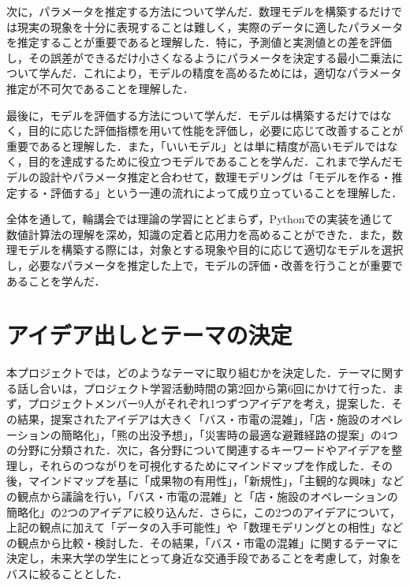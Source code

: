 次に，パラメータを推定する方法について学んだ．数理モデルを構築するだけでは現実の現象を十分に表現することは難しく，実際のデータに適したパラメータを推定することが重要であると理解した．特に，予測値と実測値との差を評価し，その誤差ができるだけ小さくなるようにパラメータを決定する最小二乗法について学んだ．これにより，モデルの精度を高めるためには，適切なパラメータ推定が不可欠であることを理解した．

最後に，モデルを評価する方法について学んだ．モデルは構築するだけではなく，目的に応じた評価指標を用いて性能を評価し，必要に応じて改善することが重要であると理解した．また，「いいモデル」とは単に精度が高いモデルではなく，目的を達成するために役立つモデルであることを学んだ．これまで学んだモデルの設計やパラメータ推定と合わせて，数理モデリングは「モデルを作る・推定する・評価する」という一連の流れによって成り立っていることを理解した．

全体を通して，輪講会では理論の学習にとどまらず，Pythonでの実装を通じて数値計算法の理解を深め，知識の定着と応用力を高めることができた．また，数理モデルを構築する際には，対象とする現象や目的に応じて適切なモデルを選択し，必要なパラメータを推定した上で，モデルの評価・改善を行うことが重要であることを学んだ．

\section{アイデア出しとテーマの決定}
本プロジェクトでは，どのようなテーマに取り組むかを決定した．テーマに関する話し合いは，プロジェクト学習活動時間の第2回から第6回にかけて行った．まず，プロジェクトメンバー9人がそれぞれ1つずつアイデアを考え，提案した．その結果，提案されたアイデアは大きく「バス・市電の混雑」，「店・施設のオペレーションの簡略化」，「熊の出没予想」，「災害時の最適な避難経路の提案」の4つの分野に分類された．次に，各分野について関連するキーワードやアイデアを整理し，それらのつながりを可視化するためにマインドマップを作成した．その後，マインドマップを基に「成果物の有用性」，「新規性」，「主観的な興味」などの観点から議論を行い，「バス・市電の混雑」と「店・施設のオペレーションの簡略化」の2つのアイデアに絞り込んだ．さらに，この2つのアイデアについて，上記の観点に加えて「データの入手可能性」や「数理モデリングとの相性」などの観点から比較・検討した．その結果，「バス・市電の混雑」に関するテーマに決定し，未来大学の学生にとって身近な交通手段であることを考慮して，対象をバスに絞ることとした．
